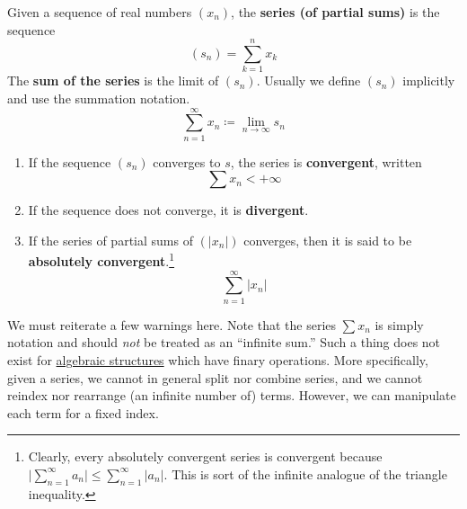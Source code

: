   \begin{definition}
    \label{def:series-over-r}
    Given a sequence of real numbers $(x_n)$, the \textbf{series (of partial sums)} is the sequence 
    \begin{equation}
      (s_n) = \sum_{k=1}^n x_k
    \end{equation}
    The \textbf{sum of the series} is the limit of $(s_n)$. Usually we define $(s_n)$ implicitly and use the summation notation. 
    \begin{equation}
      \sum_{n=1}^\infty x_n \coloneqq \lim_{n \rightarrow \infty} s_n
    \end{equation}
    \begin{enumerate}
      \item If the sequence $(s_n)$ converges to $s$, the series is \textbf{convergent}, written 
      \begin{equation}
        \sum x_n < +\infty
      \end{equation}
      \item If the sequence does not converge, it is \textbf{divergent}. 
      \item If the series of partial sums of $(|x_n|)$ converges, then it is said to be \textbf{absolutely convergent}.\footnote{Clearly, every absolutely convergent series is convergent because $\big|\sum_{n=1}^\infty a_n \big| \leq \sum_{n=1}^\infty |a_n|$. This is sort of the infinite analogue of the triangle inequality.}
      \begin{equation}
        \sum_{n=1}^\infty |x_n|
      \end{equation}
    \end{enumerate}
  \end{definition}

  We must reiterate a few warnings here. Note that the series $\sum x_n$ is simply notation and should \textit{not} be treated as an ``infinite sum.'' Such a thing does not exist for \hyperref[alg-def:algebraic-structure]{algebraic structures} which have finary operations. More specifically, given a series, we cannot in general split nor combine series, and we cannot reindex nor rearrange (an infinite number of) terms. However, we can manipulate each term for a fixed index. 

